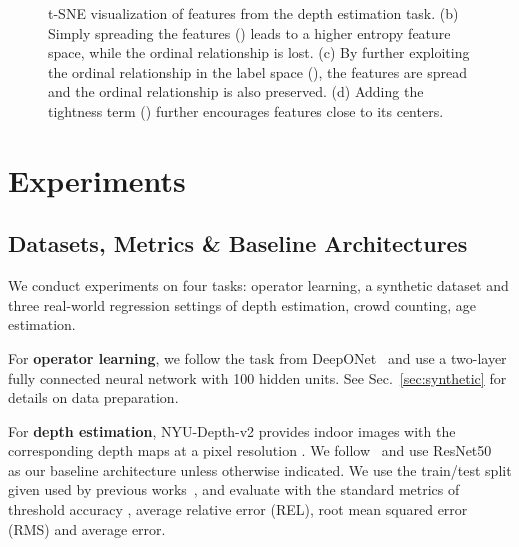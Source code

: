 \documentclass{article} \usepackage{iclr2023_conference,times}
\begin{document}
\begin{figure}[!t]
\centering
{}
\caption{t-SNE visualization 
of features from the depth estimation task. (b) Simply spreading the features () leads to a higher entropy feature space, while the ordinal relationship is lost. (c) By further exploiting the ordinal relationship in the label space (), the features are spread and the ordinal relationship is also preserved. (d) Adding the tightness term () further encourages features close to its centers.}
\label{fig_vis}
\end{figure}



\section{Experiments}
\label{sec:experiment}

\subsection{Datasets,  Metrics \& Baseline Architectures}
We conduct experiments on four tasks: operator learning, a synthetic dataset and three real-world regression settings of depth estimation, crowd counting, age estimation. 

For \textbf{operator learning}, we follow the task from DeepONet~\citep{lu2021learning} and use a two-layer fully connected neural network with 100 hidden units. See Sec.~\ref{sec:synthetic} for details on data preparation. 

For \textbf{depth estimation}, NYU-Depth-v2 \citep{silberman2012indoor} provides indoor images with the corresponding depth maps at a pixel resolution . 
We follow~\citep{lee2019big} and use ResNet50~\citep{he2016deep} as our baseline architecture unless otherwise indicated.  We use the train/test split given used by previous works~\citep{bhat2021adabins,yuan2022new}, 
and evaluate with the standard metrics of threshold accuracy ,  average relative error (REL), root mean squared error (RMS)  and average  error.  
\end{document}
